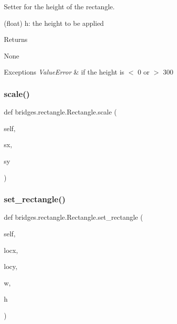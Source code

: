 Setter for the height of the rectangle. 

(float) h\+: the height to be applied \begin{DoxyReturn}{Returns}


None
\end{DoxyReturn}

\begin{DoxyExceptions}{Exceptions}
{\em Value\+Error} & if the height is $<$ 0 or $>$ 300 \\
\hline
\end{DoxyExceptions}
\mbox{\label{classbridges_1_1rectangle_1_1_rectangle_af540e714f768efb6142310047fffc8c7}} 
\subsubsection{\texorpdfstring{scale()}{scale()}}
{\footnotesize\ttfamily def bridges.\+rectangle.\+Rectangle.\+scale (\begin{DoxyParamCaption}\item[{}]{self,  }\item[{}]{sx,  }\item[{}]{sy }\end{DoxyParamCaption})}

\mbox{\label{classbridges_1_1rectangle_1_1_rectangle_a187376dcdc5c10c5b1ce5f3f00a80961}} 
\subsubsection{\texorpdfstring{set\+\_\+rectangle()}{set\_rectangle()}}
{\footnotesize\ttfamily def bridges.\+rectangle.\+Rectangle.\+set\+\_\+rectangle (\begin{DoxyParamCaption}\item[{}]{self,  }\item[{}]{locx,  }\item[{}]{locy,  }\item[{}]{w,  }\item[{}]{h }\end{DoxyParamCaption})}



